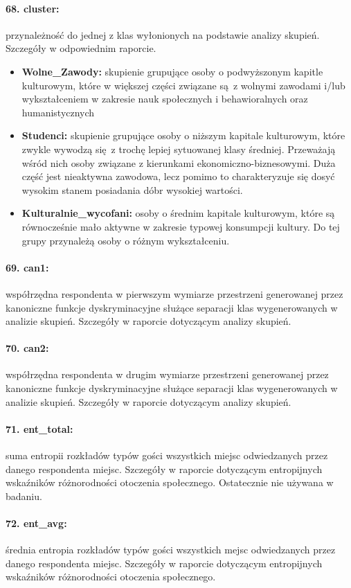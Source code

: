 \documentclass[10pt, a4paper]{article}
\begin{document}
\paragraph{68. cluster:} przynależność do jednej z klas wyłonionych na podstawie analizy skupień. Szczegóły w odpowiednim raporcie.
\begin{itemize}
	\item {\bf Wolne\_Zawody:} skupienie grupujące osoby o podwyższonym kapitle kulturowym, które w większej części związane są z wolnymi zawodami i/lub wykształceniem w zakresie nauk społecznych i behawioralnych oraz humanistycznych
	\item {\bf Studenci:} skupienie grupujące osoby o niższym kapitale kulturowym, które zwykle wywodzą się z trochę lepiej sytuowanej klasy średniej. Przeważają wśród nich osoby związane z kierunkami ekonomiczno-biznesowymi. Duża część jest nieaktywna zawodowa, lecz pomimo to charakteryzuje się dosyć wysokim stanem posiadania dóbr wysokiej wartości.
	\item {\bf Kulturalnie\_wycofani:} osoby o średnim kapitale kulturowym, które są równocześnie mało aktywne w zakresie typowej konsumpcji kultury. Do tej grupy przynależą osoby o różnym wykształceniu.
\end{itemize}
\paragraph{69. can1:} współrzędna respondenta w pierwszym wymiarze przestrzeni generowanej przez kanoniczne funkcje dyskryminacyjne służące separacji klas wygenerowanych w analizie skupień. Szczegóły w raporcie dotyczącym analizy skupień.
\paragraph{70. can2:} współrzędna respondenta w drugim wymiarze przestrzeni generowanej przez kanoniczne funkcje dyskryminacyjne służące separacji klas wygenerowanych w analizie skupień. Szczegóły w raporcie dotyczącym analizy skupień.
\paragraph{71. ent\_total:} suma entropii rozkładów typów gości wszystkich miejsc odwiedzanych przez danego respondenta miejsc. Szczegóły w raporcie dotyczącym entropijnych wskaźników różnorodności otoczenia społecznego. Ostatecznie nie używana w badaniu.
\paragraph{72. ent\_avg:} średnia entropia rozkładów typów gości wszystkich mejsc odwiedzanych przez danego respondenta miejsc. Szczegóły w raporcie dotyczącym entropijnych wskaźników różnorodności otoczenia społecznego.
\end{document}
